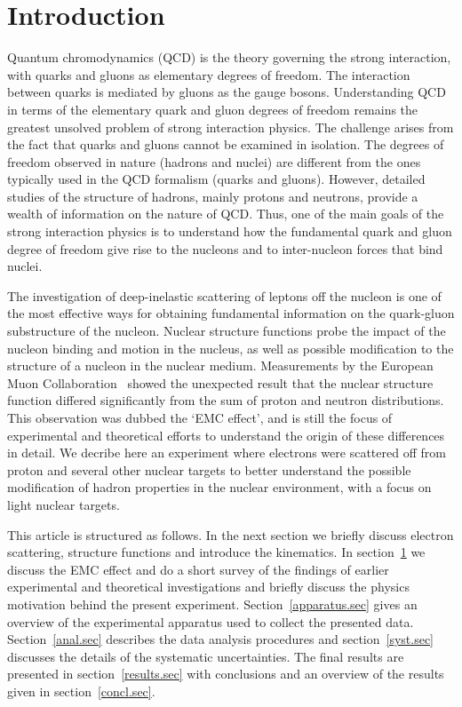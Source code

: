 \section{Introduction} \label{intro.sec}

Quantum chromodynamics (QCD) is the theory governing the strong interaction,
with quarks and gluons as elementary degrees of freedom. The interaction
between quarks is mediated by gluons as the gauge bosons. Understanding QCD in
terms of the elementary quark and gluon degrees of freedom remains the
greatest unsolved problem of strong interaction physics. The challenge
arises from the fact that quarks and gluons cannot be examined in isolation.
The degrees of freedom observed in nature (hadrons and nuclei) are different
from the ones typically used in the QCD formalism (quarks and gluons).
However, detailed studies of the structure of hadrons, mainly protons and
neutrons, provide a wealth of information on the nature of QCD. Thus, one of
the main goals of the strong interaction physics is to understand how the
fundamental quark and gluon degree of freedom give rise to the nucleons and to
inter-nucleon forces that bind nuclei.
 

The investigation of deep-inelastic scattering of leptons off the nucleon is
one of the most effective ways for obtaining fundamental information on the
quark-gluon substructure of the nucleon. Nuclear structure functions probe the
impact of the nucleon binding and motion in the nucleus, as well as possible
modification to the structure of a nucleon in the nuclear medium. Measurements
by the European Muon Collaboration~\cite{aubert83} showed the unexpected
result that the nuclear structure function differed significantly from the
sum of proton and neutron distributions.  This observation was dubbed the
`EMC effect', and is still the focus of experimental and theoretical efforts
to understand the origin of these differences in detail.  We decribe here
an experiment where electrons were scattered off from proton and several other
nuclear targets to better understand the possible modification of hadron
properties in the nuclear environment, with a focus on light nuclear targets.

This article is structured as follows. In the next section we briefly
discuss electron scattering, structure functions and introduce the
kinematics. In section~\ref{intro.sec} we discuss the EMC effect and do a short
survey of the findings of earlier experimental and theoretical investigations
and briefly discuss the physics motivation behind the present
experiment. Section~\ref{apparatus.sec} gives an overview of the experimental
apparatus used to collect the presented data. Section~\ref{anal.sec} describes
the data analysis procedures and section~\ref{syst.sec} discusses the details
of the systematic uncertainties. The final results are presented in
section~\ref{results.sec} with conclusions and an overview of the results
given in section~\ref{concl.sec}.



